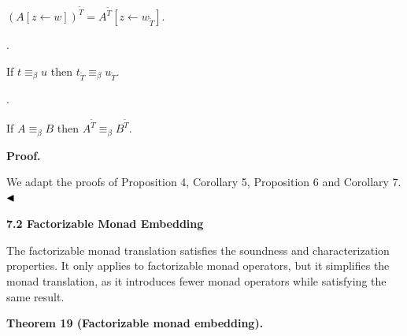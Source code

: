 \documentclass[10pt,a4paper]{article}
\begin{document}
$(A[z\leftarrow w])^{\widetilde{T}}=A^{\widetilde{T}}[z\leftarrow w_{\widetilde{T}}]$.\par
 
 
 
\par{}. 
 
If $t\equiv_{\beta}u$ then $t_{\widetilde{T}}\equiv_{\beta}u_{\widetilde{T}}$.\par
 
 
 
\par{}. 
 
If $A\equiv_{\beta}B$ then $A^{\widetilde{T}}\equiv_{\beta}B^{\widetilde{T}}$.\par
 
 
  
 
 
 
\par\medskip\noindent\textbf{Proof.}\par
 
 
We adapt the proofs of Proposition 4, Corollary 5, Proposition 6 and Corollary 7. $\hfill\blacktriangleleft$\par
 
 
 
 
 
\par\medskip\noindent\textbf{7.2 Factorizable Monad Embedding}\par
 
 
The factorizable monad translation satisfies the soundness and characterization properties. It only applies to factorizable monad operators, but it simplifies the monad translation, as it introduces fewer monad operators while satisfying the same result.\par
 
 
 
\par\medskip\noindent\textbf{Theorem 19 (Factorizable monad embedding).}\par
 
\end{document}
